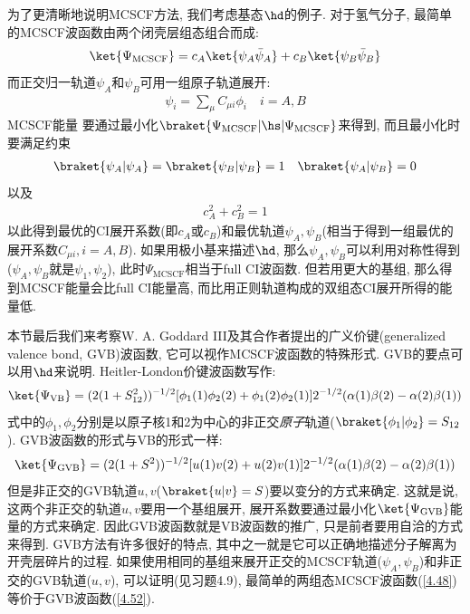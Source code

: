 为了更清晰地说明MCSCF方法, 
我们考虑基态$\hd$的例子. 
对于氢气分子, 
最简单的MCSCF波函数由两个闭壳层组态组合而成:
\begin{align}\label{4.48}
\ket{\Psi_\mathrm{MCSCF}} = c_A\ket{\psi_A\bar{\psi}_A} + c_B\ket{\psi_B\bar{\psi}_B} 
\end{align}
而正交归一轨道$\psi_A$和$\psi_B$可用一组原子轨道展开:
\begin{align}
\psi_i=\sum_\mu C_{\mu i}\phi_i\quad i=A,B
\end{align}
MCSCF能量 要通过最小化$\braket{\Psi_\mathrm{MCSCF}|\hs|\Psi_\mathrm{MCSCF}}$来得到, 而且最小化时要满足约束
\begin{align}
\braket{\psi_A|\psi_A} = \braket{\psi_B|\psi_B}=1\quad \braket{\psi_A|\psi_B}=0
\end{align}
以及
\begin{align}
c_A^2 + c_B^2 = 1
\end{align}
以此得到最优的CI展开系数(即$c_A$或$c_B$)和最优轨道$\psi_A,\psi_B$(相当于得到一组最优的展开系数$C_{\mu i}, i=A,B$). 
如果用极小基来描述$\hd$, 
那么$\psi_A,\psi_B$可以利用对称性得到($\psi_A,\psi_B$就是$\psi_1,\psi_2$), 
此时$\Psi_\mathrm{MCSCF}$相当于full CI波函数. 
但若用更大的基组, 
那么得到MCSCF能量会比full CI能量高, 
而比用\hft 正则轨道构成的双组态CI展开所得的能量低.


本节最后我们来考察W. A. Goddard III及其合作者提出的广义价键(generalized valence bond, 
GVB)波函数, 
它可以视作MCSCF波函数的特殊形式. 
GVB的要点可以用$\hd$来说明. 
Heitler-London价键波函数写作:
\begin{align}
\ket{\Psi_\mathrm{VB}} = (2(1+S_{12}^2))^{-1/2} [\phi_1(1)\phi_2(2) + \phi_1(2)\phi_2(1)]2^{-1/2}(\alpha(1)\beta(2)-\alpha(2)\beta(1))
\end{align}
式中的$\phi_1,\phi_2$分别是以原子核1和2为中心的非正交\emph{原子}轨道($\braket{\phi_1|\phi_2}=S_{12}$). 
GVB波函数的形式与VB的形式一样:
\begin{align}\label{4.52}
	\ket{\Psi_\mathrm{GVB}} = (2(1+S^2))^{-1/2} [u(1)v(2) + u(2)v(1)]2^{-1/2}(\alpha(1)\beta(2)-\alpha(2)\beta(1))
\end{align}
但是非正交的GVB轨道$u,v$($\braket{u|v}=S$)要以变分的方式来确定. 
这就是说, 
这两个非正交的轨道$u,v$要用一个基组展开, 
展开系数要通过最小化$\ket{\Psi_\mathrm{GVB}}$能量的方式来确定. 
因此GVB波函数就是VB波函数的推广, 
只是前者要用自洽的方式来得到. 
GVB方法有许多很好的特点, 
其中之一就是它可以正确地描述分子解离为开壳层碎片的过程. 
如果使用相同的基组来展开正交的MCSCF轨道($\psi_A,\psi_B$)和非正交的GVB轨道($u,v$), 
可以证明(见习题4.9), 
最简单的两组态MCSCF波函数(\autoref{4.48})等价于GVB波函数(\autoref{4.52}).


